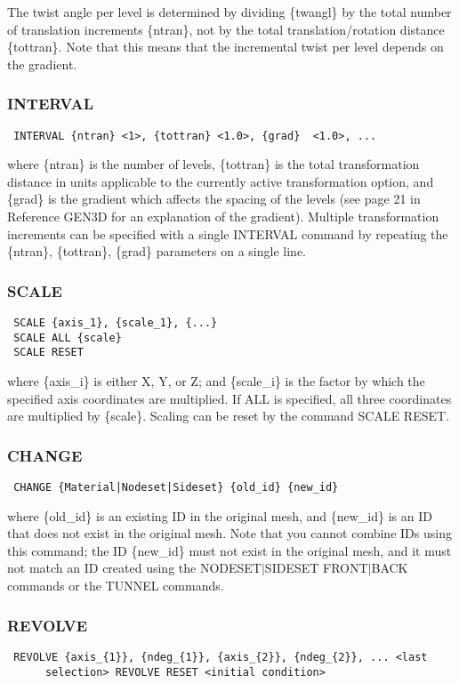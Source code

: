 The twist angle per level is determined by dividing \{twangl\} by the
total number of translation increments \{ntran\}, not by the total
translation/rotation distance \{tottran\}.  Note that this means that the
incremental twist per level depends on the gradient.
\subsubsection{INTERVAL}
\begin{verbatim}
 INTERVAL {ntran} <1>, {tottran} <1.0>, {grad}  <1.0>, ...
\end{verbatim}

where \{ntran\} is the number of levels, \{tottran\} is the total
transformation distance in units applicable to the currently active
transformation option, and \{grad\} is the gradient which affects the
spacing of the levels (see page 21 in Reference GEN3D for an
explanation of the gradient).  Multiple transformation increments can be
specified with a single INTERVAL command by repeating the \{ntran\},
\{tottran\}, \{grad\} parameters on a single line.
\subsubsection{SCALE}
\begin{verbatim}
 SCALE {axis_1}, {scale_1}, {...} 
 SCALE ALL {scale} 
 SCALE RESET
\end{verbatim}

where \{axis\_i\} is either X, Y, or Z; and \{scale\_i\} is the factor by
which the specified axis coordinates are multiplied.  If ALL is
specified, all three coordinates are multiplied by \{scale\}.  Scaling can
be reset by the command SCALE RESET.
\subsubsection{CHANGE}
\begin{verbatim}
 CHANGE {Material|Nodeset|Sideset} {old_id} {new_id}
\end{verbatim}

where \{old\_id\} is an existing ID in the original mesh, and \{new\_id\} is
an ID that does not exist in the original mesh.  Note that you cannot
combine IDs using this command; the ID \{new\_id\} must not exist in the
original mesh, and it must not match an ID created using the
NODESET$|$SIDESET FRONT$|$BACK commands or the TUNNEL commands.

\subsubsection{REVOLVE}
\begin{verbatim}
 REVOLVE {axis_{1}}, {ndeg_{1}}, {axis_{2}}, {ndeg_{2}}, ... <last
      selection> REVOLVE RESET <initial condition>
\end{verbatim}


